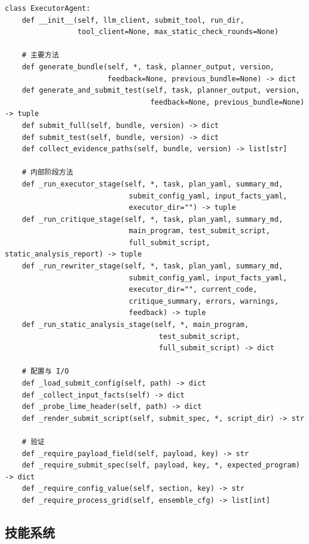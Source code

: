 \documentclass[12pt,a4paper]{ctexart}
\begin{document}
\begin{lstlisting}[style=pycode]
class ExecutorAgent:
    def __init__(self, llm_client, submit_tool, run_dir,
                 tool_client=None, max_static_check_rounds=None)

    # 主要方法
    def generate_bundle(self, *, task, planner_output, version,
                        feedback=None, previous_bundle=None) -> dict
    def generate_and_submit_test(self, task, planner_output, version,
                                  feedback=None, previous_bundle=None) -> tuple
    def submit_full(self, bundle, version) -> dict
    def submit_test(self, bundle, version) -> dict
    def collect_evidence_paths(self, bundle, version) -> list[str]

    # 内部阶段方法
    def _run_executor_stage(self, *, task, plan_yaml, summary_md,
                             submit_config_yaml, input_facts_yaml,
                             executor_dir="") -> tuple
    def _run_critique_stage(self, *, task, plan_yaml, summary_md,
                             main_program, test_submit_script,
                             full_submit_script, static_analysis_report) -> tuple
    def _run_rewriter_stage(self, *, task, plan_yaml, summary_md,
                             submit_config_yaml, input_facts_yaml,
                             executor_dir="", current_code,
                             critique_summary, errors, warnings,
                             feedback) -> tuple
    def _run_static_analysis_stage(self, *, main_program,
                                    test_submit_script,
                                    full_submit_script) -> dict

    # 配置与 I/O
    def _load_submit_config(self, path) -> dict
    def _collect_input_facts(self) -> dict
    def _probe_lime_header(self, path) -> dict
    def _render_submit_script(self, submit_spec, *, script_dir) -> str

    # 验证
    def _require_payload_field(self, payload, key) -> str
    def _require_submit_spec(self, payload, key, *, expected_program) -> dict
    def _require_config_value(self, section, key) -> str
    def _require_process_grid(self, ensemble_cfg) -> list[int]
\end{lstlisting}

\subsection{技能系统}
\end{document}
